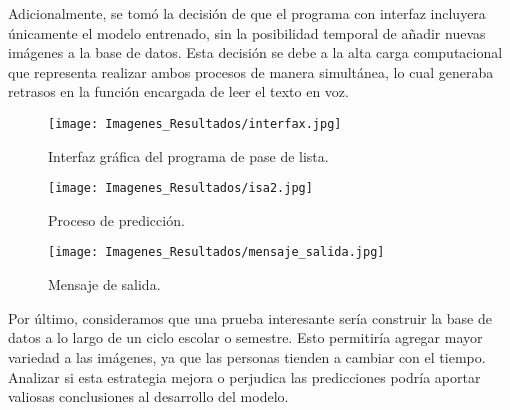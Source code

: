 \documentclass[12pt, letterpaper]{article}
\begin{document}
Adicionalmente, se tomó la decisión de que el programa con interfaz incluyera únicamente el modelo entrenado, sin la posibilidad temporal de añadir nuevas imágenes a la base de datos. Esta decisión se debe a la alta carga computacional que representa realizar ambos procesos de manera simultánea, lo cual generaba retrasos en la función encargada de leer el texto en voz.\par

\begin{figure}[H]
    \centering
    \texttt{[image: Imagenes\_Resultados/interfax.jpg]} 
    \caption{Interfaz gráfica del programa de pase de lista.}
    \label{fig:etiqueta}
\end{figure}

\begin{figure}[H]
    \centering
    \texttt{[image: Imagenes\_Resultados/isa2.jpg]} 
    \caption{Proceso de predicción.}
    \label{fig:etiqueta}
\end{figure}

\begin{figure}[H]
    \centering
    \texttt{[image: Imagenes\_Resultados/mensaje\_salida.jpg]} 
    \caption{Mensaje de salida.}
    \label{fig:etiqueta}
\end{figure}

Por último, consideramos que una prueba interesante sería construir la base de datos a lo largo de un ciclo escolar o semestre. Esto permitiría agregar mayor variedad a las imágenes, ya que las personas tienden a cambiar con el tiempo. Analizar si esta estrategia mejora o perjudica las predicciones podría aportar valiosas conclusiones al desarrollo del modelo.
\end{document}
